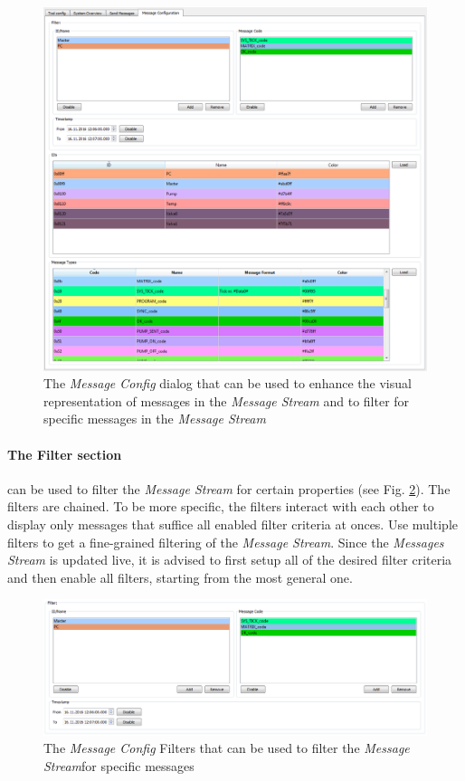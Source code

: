 \documentclass[12pt,a4paper]{scrartcl}
\begin{document}
\begin{figure}
	\centering
	\includegraphics[width=\linewidth,keepaspectratio]{Graphics/MessageConfigOverview}
	\caption[Message Config Dialog]{The \textit{Message Config} dialog that can be used to enhance the visual representation of messages in the \textit{Message Stream} and to filter for specific messages in the \textit{Message Stream}}
	\label{fig:MessageConfigOvrv}
\end{figure}

\paragraph{The Filter section} can be used to filter the \textit{Message Stream} for certain properties (see Fig. \ref{fig:MessageConfigFilter}). The filters are chained. To be more specific, the filters interact with each other to display only messages that suffice all enabled filter criteria at onces. Use multiple filters to get a fine-grained filtering of the \textit{Message Stream}. Since the \textit{Messages Stream} is updated live, it is advised to first setup all of the desired filter criteria and then enable all filters, starting from the most general one.

\begin{figure}
	\centering
	\includegraphics[width=\linewidth,keepaspectratio]{Graphics/MessageConfigFilter}
	\caption[Message Config Filter]{The \textit{Message Config} Filters that can be used to filter the \textit{Message Stream}for specific messages}
	\label{fig:MessageConfigFilter}
\end{figure}
\end{document}
